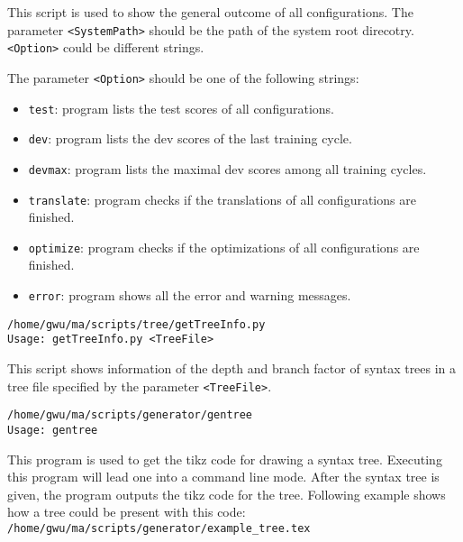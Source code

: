 This script is used to show the general outcome of all configurations. The parameter \verb|<SystemPath>| should be the path of the system root direcotry. \verb|<Option>| could be different strings.

The parameter \verb|<Option>| should be one of the following strings:
\begin{itemize}
  \setlength{\itemsep}{0cm}%
  \setlength{\parskip}{0cm}%
  \item \verb|test|: program lists the test scores of all configurations.
  \item \verb|dev|: program lists the dev scores of the last training cycle.
  \item \verb|devmax|: program lists the maximal dev scores among all training cycles.
  \item \verb|translate|: program checks if the translations of all configurations are finished.
  \item \verb|optimize|: program checks if the optimizations of all configurations are finished.
  \item \verb|error|: program shows all the error and warning messages.
\end{itemize}
%

\verb|/home/gwu/ma/scripts/tree/getTreeInfo.py|\\
\verb|Usage: getTreeInfo.py <TreeFile>|

This script shows information of the depth and branch factor of syntax trees in a tree file specified by the parameter \verb|<TreeFile>|. 

\verb|/home/gwu/ma/scripts/generator/gentree| \\
\verb|Usage: gentree|

This program is used to get the tikz code for drawing a syntax tree. Executing this program will lead one into a command line mode. After the syntax tree is given, the program outputs the tikz code for the tree. Following example shows how a tree could be present with this code:\\
\verb|/home/gwu/ma/scripts/generator/example_tree.tex|

